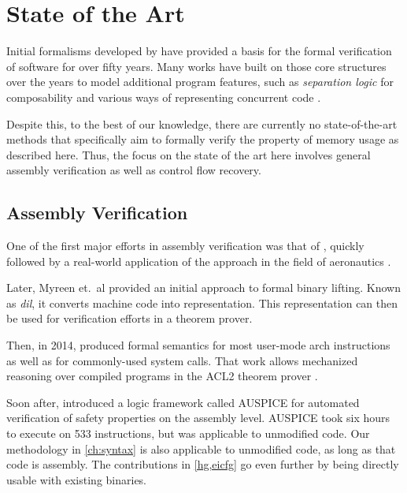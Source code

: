 \section{State of the Art}
Initial formalisms developed by \textcite{floyd1967assigning,hoare1969axiomatic} have provided a basis for the formal verification of software for over fifty years.
Many works have built on those core structures over the years to model additional program features, such as \emph{separation logic} \autocite{reynolds2002separation} for composability and various ways of representing concurrent code \autocite{owicki1976gries,xu1997rely-guarantee}.

Despite this, to the best of our knowledge, there are currently no state-of-the-art methods that specifically aim to formally verify the property of memory usage as described here.
Thus, the focus on the state of the art here involves general assembly verification as well as control flow recovery.

\subsection{Assembly Verification}
One of the first major efforts in assembly verification was that of \textcite{clutterbuck1986validation,clutterbuck1988verification}, quickly followed by a real-world application of the approach in the field of aeronautics \autocite{oneill1988verification}.

Later, Myreen et.\ al provided an initial approach to formal binary lifting.
Known as \emph{\ac{dil}}, it converts machine code into  representation.
This representation can then be used for verification efforts in a theorem prover.

Then, in 2014, \textcite{goel2014syscalls,goelphd} produced formal semantics
for most user-mode \gls{arch} instructions as well as for commonly-used system calls.
That work allows mechanized reasoning over compiled programs in the ACL2 theorem prover \autocite{ACL2}.

Soon after, \textcite{tan2015auspice} introduced a logic framework called AUSPICE for automated verification of safety properties on the assembly level.
AUSPICE took six hours to execute on \num{533} instructions, but was applicable to unmodified code.
Our methodology in \cref{ch:syntax} is also applicable to unmodified code, as long as that code is assembly.
The contributions in \cref{hg,eicfg} go even further by being directly usable with existing binaries.

